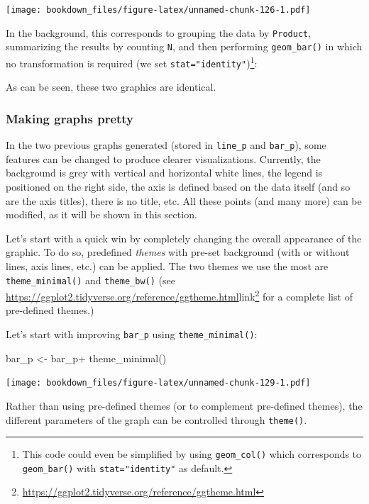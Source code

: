 \documentclass[
]{krantz}
\makeatletter
\newenvironment{Shaded}{\begin{snugshade}}{\end{snugshade}}
\newcommand{\FunctionTok}[1]{\textcolor[rgb]{0,0,0}{#1}}
\newcommand{\NormalTok}[1]{#1}
\newcommand{\OtherTok}[1]{\textcolor[rgb]{0.37,0.37,0.37}{#1}}
\newcommand{\SpecialCharTok}[1]{\textcolor[rgb]{0,0,0}{#1}}
\renewcommand{\href}[2]{#2\footnote{\url{#1}}}
\newenvironment{kframe}{%
\medskip{}
\setlength{\fboxsep}{.8em}
 \def\at@end@of@kframe{}%
 \ifinner\ifhmode%
  \def\at@end@of@kframe{\end{minipage}}%
  \begin{minipage}{\columnwidth}%
 \fi\fi%
 \def\FrameCommand##1{\hskip\@totalleftmargin \hskip-\fboxsep
 \colorbox{shadecolor}{##1}\hskip-\fboxsep
     \hskip-\linewidth \hskip-\@totalleftmargin \hskip\columnwidth}%
 \MakeFramed {\advance\hsize-\width
   \@totalleftmargin\z@ \linewidth\hsize
   \@setminipage}}%
 {\par\unskip\endMakeFramed%
 \at@end@of@kframe}
\renewenvironment{Shaded}{\begin{kframe}}{\end{kframe}}
\makeatother
\begin{document}
\texttt{[image: bookdown\_files/figure-latex/unnamed-chunk-126-1.pdf]}

In the background, this corresponds to grouping the data by \texttt{Product}, summarizing the results by counting \texttt{N}, and then performing \texttt{geom\_bar()} in which no transformation is required (we set \texttt{stat="identity"})\footnote{This code could even be simplified by using \texttt{geom\_col()} which corresponds to \texttt{geom\_bar()} with \texttt{stat="identity"} as default.}:

As can be seen, these two graphics are identical.

\hypertarget{making-graphs-pretty}{%
\subsubsection{Making graphs pretty}\label{making-graphs-pretty}}

In the two previous graphs generated (stored in \texttt{line\_p} and \texttt{bar\_p}), some features can be changed to produce clearer visualizations. Currently, the background is grey with vertical and horizontal white lines, the legend is positioned on the right side, the axis is defined based on the data itself (and so are the axis titles), there is no title, etc. All these points (and many more) can be modified, as it will be shown in this section.

Let's start with a quick win by completely changing the overall appearance of the graphic. To do so, predefined \emph{themes} with pre-set background (with or without lines, axis lines, etc.) can be applied. The two themes we use the most are \texttt{theme\_minimal()} and \texttt{theme\_bw()} (see \url{https://ggplot2.tidyverse.org/reference/ggtheme.html}\href{https://ggplot2.tidyverse.org/reference/ggtheme.html}{link} for a complete list of pre-defined themes.)

Let's start with improving \texttt{bar\_p} using \texttt{theme\_minimal()}:

\begin{Shaded}
\begin{Highlighting}[]
\NormalTok{bar\_p }\OtherTok{\textless{}{-}}\NormalTok{ bar\_p}\SpecialCharTok{+}
  \FunctionTok{theme\_minimal}\NormalTok{()}
\end{Highlighting}
\end{Shaded}

\texttt{[image: bookdown\_files/figure-latex/unnamed-chunk-129-1.pdf]}

Rather than using pre-defined themes (or to complement pre-defined themes), the different parameters of the graph can be controlled through \texttt{theme()}.
\end{document}
